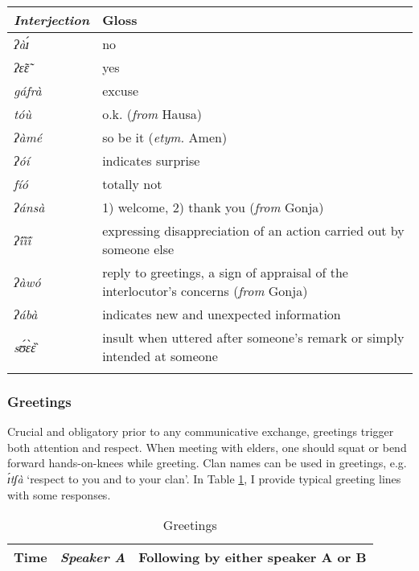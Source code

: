 \begin{exe}
\begin{exe}
\begin{exe}
{\begin{exe}
\begin{exe}
\begin{exe}
\begin{exe}
\begin{exe}
\begin{exe}
\begin{exe}
\begin{xlist}
\begin{exe}
\begin{exe}
\begin{exe}
\begin{exe}
\begin{exe}
\begin{exe}
\begin{exe}
\begin{exe}
\begin{exe}
\begin{exe}
\begin{exe}
\begin{exe}
\begin{exe}
\begin{exe}
\begin{exe}
\begin{table}[!htb]
\begin{tabular}{>{\itshape}lp{8cm}}
\lsptoprule
{\rm Interjection} & Gloss\\[1ex] \midrule
ʔàɪ́  &  no  \\
ʔɛ̃ɛ̃    &yes  \\
gáfrà  &  excuse  \\
tóù  &  o.k.  ({\it from}  Hausa)\\
ʔàmé   & so be it  ({\it etym.}  Amen)  \\
ʔóí  &  indicates surprise\\
fíó  & totally not  \\
ʔánsà  &  1) welcome, 2) thank you    ({\it from} Gonja)\\
ʔĩ́ĩ̀ĩ́  &  
expressing disappreciation of an action
carried out by someone else\\
ʔàwó  &  reply to greetings, a sign of appraisal of the interlocutor's
concerns ({\it from} Gonja)\\
 ʔábà & indicates new and unexpected information\\
sʊ́ɛ̀ɛ̏ & insult when uttered after someone's remark or simply intended at
someone\\ 
\lspbottomrule
\end{tabular}
\end{table}


\subsubsection{Greetings}
\label{sec:GRM-greet}

Crucial and obligatory prior to any communicative exchange, greetings trigger
both attention and respect. When meeting with elders, one should  squat  or bend
forward hands-on-knees  while greeting. Clan names can be used in greetings,
e.g. {\it ɪ́tʃà} `respect to you and to your clan'. In Table
\ref{tab:greetings},  I provide typical greeting lines with some responses.




\begin{table}[!htb]
\small
\centering
\caption{Greetings\label{tab:greetings}}

\begin{tabular}{l>{\itshape}lp{7cm}}
\lsptoprule
Time & {\rm Speaker A} & Following by either speaker A or B\\ \midrule


\end{tabular}
\end{table}
\end{exe}
\end{exe}
\end{exe}
\end{exe}
\end{exe}
\end{exe}
\end{exe}
\end{exe}
\end{exe}
\end{exe}
\end{exe}
\end{exe}
\end{exe}
\end{exe}
\end{exe}
\end{xlist}
\end{exe}
\end{exe}
\end{exe}
\end{exe}
\end{exe}
\end{exe}
\end{exe}}
\end{exe}
\end{exe}
\end{exe}
